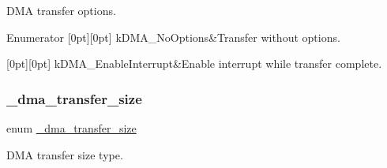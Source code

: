 D\+MA transfer options. 

\begin{DoxyEnumFields}{Enumerator}
[0pt][0pt]{}\mbox{\label{group__dma_gga1497caa1db3c7b45b95f6c8658167fe1addc6103be52651841e795cccc872988b}} 
k\+D\+M\+A\+\_\+\+No\+Options&Transfer without options. \\
\hline

[0pt][0pt]{}\mbox{\label{group__dma_gga1497caa1db3c7b45b95f6c8658167fe1ad289b8b98ee6cf2faa4788404fe809d8}} 
k\+D\+M\+A\+\_\+\+Enable\+Interrupt&Enable interrupt while transfer complete. \\
\hline

\end{DoxyEnumFields}
\mbox{\label{group__dma_ga0b291003d51dd119595ed7aa7462a693}} 
\subsubsection{\texorpdfstring{\_dma\_transfer\_size}{\_dma\_transfer\_size}}
{\footnotesize\ttfamily enum \mbox{\hyperlink{group__dma_ga0b291003d51dd119595ed7aa7462a693}{\+\_\+dma\+\_\+transfer\+\_\+size}}}



D\+MA transfer size type. 

